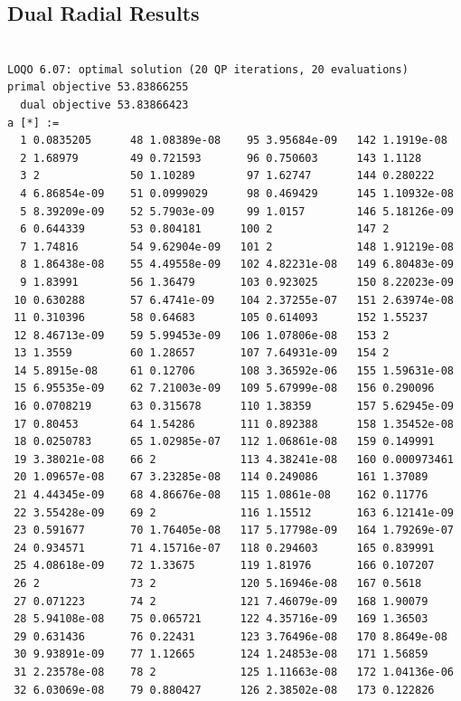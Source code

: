 \documentclass{article}
\begin{document}
\subsection{Dual Radial Results}

\begin{verbatim}

LOQO 6.07: optimal solution (20 QP iterations, 20 evaluations)
primal objective 53.83866255
  dual objective 53.83866423
a [*] :=
  1 0.0835205      48 1.08389e-08    95 3.95684e-09   142 1.1919e-08
  2 1.68979        49 0.721593       96 0.750603      143 1.1128
  3 2              50 1.10289        97 1.62747       144 0.280222
  4 6.86854e-09    51 0.0999029      98 0.469429      145 1.10932e-08
  5 8.39209e-09    52 5.7903e-09     99 1.0157        146 5.18126e-09
  6 0.644339       53 0.804181      100 2             147 2
  7 1.74816        54 9.62904e-09   101 2             148 1.91219e-08
  8 1.86438e-08    55 4.49558e-09   102 4.82231e-08   149 6.80483e-09
  9 1.83991        56 1.36479       103 0.923025      150 8.22023e-09
 10 0.630288       57 6.4741e-09    104 2.37255e-07   151 2.63974e-08
 11 0.310396       58 0.64683       105 0.614093      152 1.55237
 12 8.46713e-09    59 5.99453e-09   106 1.07806e-08   153 2
 13 1.3559         60 1.28657       107 7.64931e-09   154 2
 14 5.8915e-08     61 0.12706       108 3.36592e-06   155 1.59631e-08
 15 6.95535e-09    62 7.21003e-09   109 5.67999e-08   156 0.290096
 16 0.0708219      63 0.315678      110 1.38359       157 5.62945e-09
 17 0.80453        64 1.54286       111 0.892388      158 1.35452e-08
 18 0.0250783      65 1.02985e-07   112 1.06861e-08   159 0.149991
 19 3.38021e-08    66 2             113 4.38241e-08   160 0.000973461
 20 1.09657e-08    67 3.23285e-08   114 0.249086      161 1.37089
 21 4.44345e-09    68 4.86676e-08   115 1.0861e-08    162 0.11776
 22 3.55428e-09    69 2             116 1.15512       163 6.12141e-09
 23 0.591677       70 1.76405e-08   117 5.17798e-09   164 1.79269e-07
 24 0.934571       71 4.15716e-07   118 0.294603      165 0.839991
 25 4.08618e-09    72 1.33675       119 1.81976       166 0.107207
 26 2              73 2             120 5.16946e-08   167 0.5618
 27 0.071223       74 2             121 7.46079e-09   168 1.90079
 28 5.94108e-08    75 0.065721      122 4.35716e-09   169 1.36503
 29 0.631436       76 0.22431       123 3.76496e-08   170 8.8649e-08
 30 9.93891e-09    77 1.12665       124 1.24853e-08   171 1.56859
 31 2.23578e-08    78 2             125 1.11663e-08   172 1.04136e-06
 32 6.03069e-08    79 0.880427      126 2.38502e-08   173 0.122826

\end{verbatim}
\end{document}
